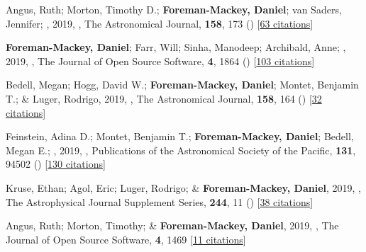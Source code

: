 \item[{\color{numcolor}\scriptsize50}] Angus, Ruth; Morton, Timothy D.; \textbf{Foreman-Mackey, Daniel}; van Saders, Jennifer; \etal, 2019, , The Astronomical Journal, \textbf{158}, 173 () [\href{https://ui.adsabs.harvard.edu/abs/2019AJ....158..173A}{63 citations}]

\item[{\color{numcolor}\scriptsize49}] \textbf{Foreman-Mackey, Daniel}; Farr, Will; Sinha, Manodeep; Archibald, Anne; \etal, 2019, , The Journal of Open Source Software, \textbf{4}, 1864 () [\href{https://ui.adsabs.harvard.edu/abs/2019JOSS....4.1864F}{103 citations}]

\item[{\color{numcolor}\scriptsize48}] Bedell, Megan; Hogg, David W.; \textbf{Foreman-Mackey, Daniel}; Montet, Benjamin T.; \& Luger, Rodrigo, 2019, , The Astronomical Journal, \textbf{158}, 164 () [\href{https://ui.adsabs.harvard.edu/abs/2019AJ....158..164B}{32 citations}]

\item[{\color{numcolor}\scriptsize47}] Feinstein, Adina D.; Montet, Benjamin T.; \textbf{Foreman-Mackey, Daniel}; Bedell, Megan E.; \etal, 2019, , Publications of the Astronomical Society of the Pacific, \textbf{131}, 94502 () [\href{https://ui.adsabs.harvard.edu/abs/2019PASP..131i4502F}{130 citations}]

\item[{\color{numcolor}\scriptsize46}] Kruse, Ethan; Agol, Eric; Luger, Rodrigo; \& \textbf{Foreman-Mackey, Daniel}, 2019, , The Astrophysical Journal Supplement Series, \textbf{244}, 11 () [\href{https://ui.adsabs.harvard.edu/abs/2019ApJS..244...11K}{38 citations}]

\item[{\color{numcolor}\scriptsize45}] Angus, Ruth; Morton, Timothy; \& \textbf{Foreman-Mackey, Daniel}, 2019, , The Journal of Open Source Software, \textbf{4}, 1469 [\href{https://ui.adsabs.harvard.edu/abs/2019JOSS....4.1469A}{11 citations}]

